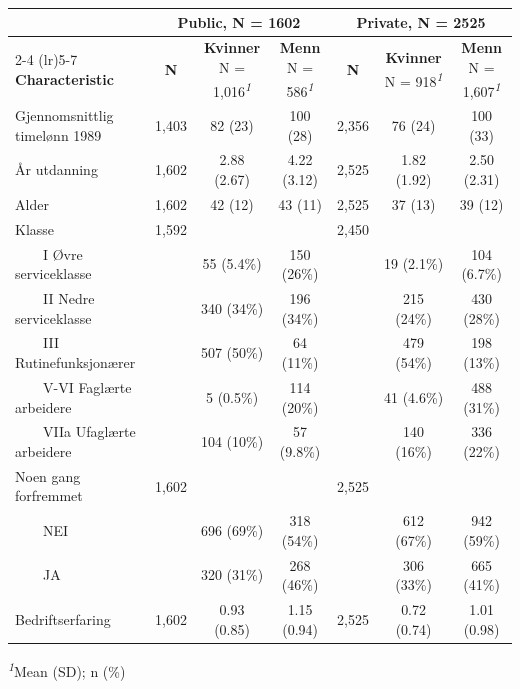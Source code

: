 \documentclass[
  norsk,
  letterpaper,
  DIV=11,
  numbers=noendperiod]{scrreprt}
\theoremstyle{definition}
\theoremstyle{remark}
\begin{document}
\begin{table}
\fontsize{12.0pt}{14.0pt}\selectfont
\begin{tabular*}{\linewidth}{@{\extracolsep{\fill}}lcccccc}
\toprule
 & \multicolumn{3}{c}{{\textbf{Public}, N = 1602}} & \multicolumn{3}{c}{{\textbf{Private}, N = 2525}} \\ 
\cmidrule(lr){2-4} \cmidrule(lr){5-7}
\textbf{Characteristic} & \textbf{N} & \textbf{Kvinner}  N = 1,016\textsuperscript{\textit{1}} & \textbf{Menn}  N = 586\textsuperscript{\textit{1}} & \textbf{N} & \textbf{Kvinner}  N = 918\textsuperscript{\textit{1}} & \textbf{Menn}  N = 1,607\textsuperscript{\textit{1}} \\ 
\midrule\addlinespace[2.5pt]
Gjennomsnittlig timelønn 1989 & 1,403 & 82 (23) & 100 (28) & 2,356 & 76 (24) & 100 (33) \\ 
År utdanning & 1,602 & 2.88 (2.67) & 4.22 (3.12) & 2,525 & 1.82 (1.92) & 2.50 (2.31) \\ 
Alder & 1,602 & 42 (12) & 43 (11) & 2,525 & 37 (13) & 39 (12) \\ 
Klasse & 1,592 &  &  & 2,450 &  &  \\ 
    I Øvre serviceklasse &  & 55 (5.4\%) & 150 (26\%) &  & 19 (2.1\%) & 104 (6.7\%) \\ 
    II Nedre serviceklasse &  & 340 (34\%) & 196 (34\%) &  & 215 (24\%) & 430 (28\%) \\ 
    III Rutinefunksjonærer &  & 507 (50\%) & 64 (11\%) &  & 479 (54\%) & 198 (13\%) \\ 
    V-VI Faglærte arbeidere &  & 5 (0.5\%) & 114 (20\%) &  & 41 (4.6\%) & 488 (31\%) \\ 
    VIIa Ufaglærte arbeidere &  & 104 (10\%) & 57 (9.8\%) &  & 140 (16\%) & 336 (22\%) \\ 
Noen gang forfremmet & 1,602 &  &  & 2,525 &  &  \\ 
    NEI &  & 696 (69\%) & 318 (54\%) &  & 612 (67\%) & 942 (59\%) \\ 
    JA &  & 320 (31\%) & 268 (46\%) &  & 306 (33\%) & 665 (41\%) \\ 
Bedriftserfaring & 1,602 & 0.93 (0.85) & 1.15 (0.94) & 2,525 & 0.72 (0.74) & 1.01 (0.98) \\ 
\bottomrule
\end{tabular*}
\begin{minipage}{\linewidth}
\vspace{.05em}
\textsuperscript{\textit{1}}Mean (SD); n (\%)\\
\end{minipage}
\end{table}
\end{document}
